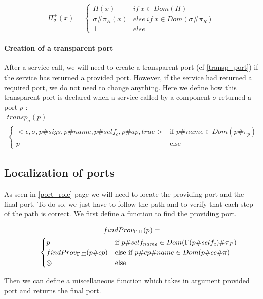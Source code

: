 \[\Pi^+_\sigma(x) = \begin{cases}
\Pi(x) & if ~ x\in Dom(\Pi)\\
\sigma\#\pi_R(x) & else~if~x\in Dom(\sigma\#\pi_R)\\
\perp & else
\end{cases}\]

\paragraph{Creation of a transparent port}
After a service call, we will need to create a transparent port (cf \ref{transp_port}) if the service has returned a provided port. However, if the service had returned a required port, we do not need to change anything. Here we define how this transparent port is declared when a service called by a component $\sigma$ returned a port $p$ : 
\begin{multline*}transp_\sigma(p)= \\
\begin{cases}
<\epsilon,\sigma,p\#sigs,p\#name,p\#self_c,p\#ap,true> & \text{if } p\#name \in Dom(p\#\pi_p)\\
p & \text{else}
\end{cases}
\end{multline*}



\subsection{Localization of ports}
As seen in \ref{port_role} page \pageref{port_role} we will need to locate the providing port and the final port. To do so, we just have to follow the path and to verify that each step of the path is correct. We first define a function to find the providing port.

\begin{multline*}findProv_{\Gamma,\Pi}(p) =\\
\qquad \begin{cases}
p &\text{if $ p\#self_{name}\in Dom(\Gamma(p\#self_c) \#\pi_P)$} \\
findProv_{\Gamma,\Pi}(p\#cp) &\text{else if $p\#cp\#name \in Dom(p\#cc\#\pi)$}\\
\otimes & \text{else}
\end{cases}
\end{multline*}

Then we can define a miscellaneous function which takes in argument provided port and returns the final port.

